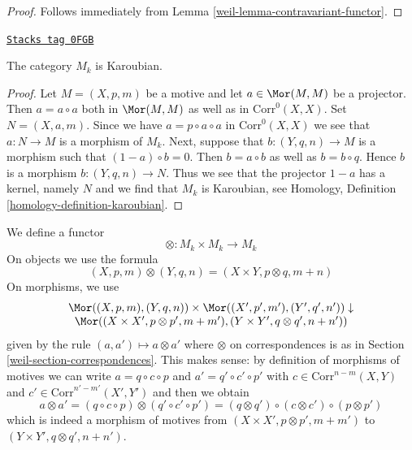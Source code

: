\begin{proof}

Follows immediately from Lemma \ref{weil-lemma-contravariant-functor}.
\end{proof}

\begin{lemma}[Karoubian]
\label{weil-lemma-Karoubian}
\href{https://stacks.math.columbia.edu/tag/0FGB}{\texttt{Stacks tag 0FGB}}

The category $M_k$ is Karoubian.
\end{lemma}

\begin{proof}
Let $M = (X, p, m)$ be a motive and let $a \in \Mor(M, M)$
be a projector. Then $a = a \circ a$ both in $\Mor(M, M)$
as well as in $\text{Corr}^0(X, X)$. Set $N = (X, a, m)$.
Since we have $a = p \circ a \circ a$ in $\text{Corr}^0(X, X)$
we see that $a : N \to M$ is a morphism of $M_k$.
Next, suppose that $b : (Y, q, n) \to M$ is a morphism
such that $(1 - a) \circ b = 0$. Then $b = a \circ b$ as well as
$b = b \circ q$. Hence $b$ is a morphism $b : (Y, q, n) \to N$.
Thus we see that the projector $1 - a$ has a kernel, namely $N$
and we find that $M_k$ is Karoubian, see
Homology, Definition \ref{homology-definition-karoubian}.
\end{proof}

We define a functor
$$
\otimes : M_k \times M_k \longrightarrow M_k
$$
On objects we use the formula
$$
(X, p, m) \otimes (Y, q, n) = (X \times Y, p \otimes q, m + n)
$$
On morphisms, we use
$$
\begin{array}{c}\Mor((X, p, m), (Y, q, n)) \times
\Mor((X', p', m'), (Y', q', n')) \downarrow \\ \Mor(
(X \times X', p \otimes p', m + m'),
(Y \times Y', q \otimes q', n + n'))\end{array}
$$
given by the rule $(a, a') \longmapsto a \otimes a'$ where
$\otimes$ on correspondences is as in Section \ref{weil-section-correspondences}.
This makes sense: by definition of morphisms of motives
we can write $a = q \circ c \circ p$ and $a' = q' \circ c' \circ p'$
with $c \in \text{Corr}^{n - m}(X, Y)$ and
$c' \in \text{Corr}^{n' - m'}(X', Y')$
and then we obtain
$$
a \otimes a' =
(q \circ c \circ p) \otimes (q' \circ c' \circ p') =
(q \otimes q') \circ (c \otimes c') \circ (p \otimes p')
$$
which is indeed a morphism of motives from
$(X \times X', p \otimes p', m + m')$ to
$(Y \times Y', q \otimes q', n + n')$.

